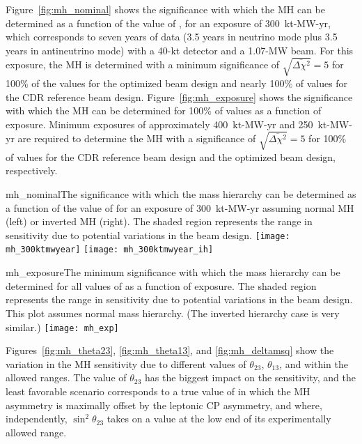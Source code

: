 Figure~\ref{fig:mh_nominal} shows the significance with which the MH can be determined as a function of the value of \deltacp, for an exposure of 300~kt-MW-yr, which corresponds to seven years of data (3.5 years in neutrino mode plus 3.5 years in antineutrino mode) with a 40-kt detector and a 1.07-MW beam.  For this exposure, the MH is determined with a minimum significance of $\sqrt{\overline{\Delta\chi^{2}}} = 5$ for 100\% of the \deltacp values for the optimized beam design and nearly 100\% of \deltacp values for the CDR reference beam design.  Figure~\ref{fig:mh_exposure} shows the significance with which the MH can be determined for 100\% of \deltacp values as a function of exposure.  Minimum exposures of approximately 400~kt-MW-yr and 250~kt-MW-yr are required to determine the MH with a significance of $\sqrt{\overline{\Delta\chi^2}} = 5$ for 100\% of \deltacp values for the CDR reference beam design and the optimized beam design, respectively.

\begin{cdrfigure}{mh_nominal}{The significance with which the mass hierarchy can be determined as a function of the value of \deltacp for an exposure of 300~kt-MW-yr assuming normal MH (left) or inverted MH (right).  The shaded region represents the range in sensitivity due to potential variations in the beam design.}
 \texttt{[image: mh\_300ktmwyear]}
 \texttt{[image: mh\_300ktmwyear\_ih]}
\end{cdrfigure}

\begin{cdrfigure}{mh_exposure}{The minimum significance with which the mass hierarchy can be determined for all values of \deltacp as a function of exposure.  The shaded region represents the range in sensitivity due to potential variations in the beam design. This plot assumes normal mass hierarchy. (The inverted hierarchy case is very similar.)}
 \texttt{[image: mh\_exp]}
\end{cdrfigure}

Figures~\ref{fig:mh_theta23}, \ref{fig:mh_theta13}, and \ref{fig:mh_deltamsq} show the variation in the MH sensitivity due to different values of $\theta_{23}$, $\theta_{13}$, and  within the allowed ranges.  The value of $\theta_{23}$ has the biggest impact on the sensitivity, and the least favorable scenario corresponds to a true value of \deltacp in which the MH asymmetry
is maximally offset by the leptonic CP asymmetry, and where, independently, 
$\sin^2{\theta_{23}}$ takes on a value at the low end of its 
experimentally allowed range.

